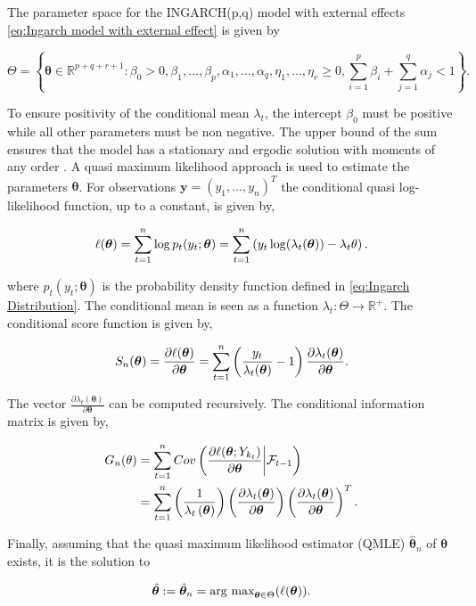 The parameter space for the INGARCH(p,q) model with external effects \ref{eq:Ingarch model with external effect} is given by 

\begin{equation*}
\Theta = \left\{ \bm{\theta} \in \mathbb{R}^{p+q+r+1}: \beta_0 > 0, \beta_1,\ldots,\beta_p,\alpha_1,\ldots,\alpha_q,\eta_1,\ldots,\eta_r \geq 0, \sum_{i=1}^p\beta_i + \sum_{j=1}^q\alpha_j < 1 \right\}.
\label{eq:Ingarch parameter space}
\end{equation*}

To ensure positivity of the conditional mean $\lambda_t$, the intercept $\beta_0$ must be positive while all other parameters must be non negative. The upper bound of the sum ensures that the model has a stationary and ergodic solution with moments of any order \cite{Ferland:2006,Fokianos:2009,Doukhan:2012}. A quasi maximum likelihood approach is used to estimate the parameters $\bm{\theta}$. 
For observations $\textbf{y} = \left(y_1,\ldots,y_n\right)^T$ the conditional quasi log-likelihood function, up to a constant, is given by,

\begin{equation}
\ell(\bm{\theta}) = \sum_{t=1}^n\log p_t(y_t;\bm{\theta}) = \sum_{t=1}^n \left(y_t\log(\lambda_t(\bm{\theta})) - \lambda_t{\theta}\right).
\label{eq: Quasi log likelihood}
\end{equation}

where $p_t(y_t;\bm{\theta})$ is the probability density function defined in \ref{eq:Ingarch Distribution}. The conditional mean is seen as a function $\lambda_t: \Theta \rightarrow \mathbb{R}^{+}$. The conditional score function is given by,

\begin{equation}
S_n(\bm{\theta}) = \frac{\partial \ell(\bm{\theta})}{\partial \bm{\theta}} = \sum_{t=1}^n\left(\frac{y_t}{\lambda_t(\bm{\theta})}-1\right)\frac{\partial\lambda_t(\bm{\theta})}{\partial \bm{\theta}}.
\label{eq:conditional score}
\end{equation}

The vector $\frac{\partial\lambda_t(\bm{\theta})}{\partial \bm{\theta}}$ can be computed recursively. 
The conditional information matrix is given by, 

\begin{align*}
G_n(\theta) &= \sum_{t=1}^n Cov\left(\frac{\partial \ell(\bm{\theta}; Y_{k_t})}{\partial \bm{\theta}} \middle| \mathcal{F}_{t-1}\right) \\
&=  \sum_{t=1}^n \left(\frac{1}{\lambda_t\left(\bm{\theta}\right)}\right) \left(\frac{\partial \lambda_t(\bm{\theta})}{\partial \bm{\theta}}\right)\left(\frac{\partial \lambda_t(\bm{\theta})}{\partial \bm{\theta}}\right)^T.
\label{eq:conditional information matrix}
\end{align*}

Finally, assuming that the quasi maximum likelihood estimator (QMLE) $\hat{\bm{\theta}}_n$ of $\bm{\theta}$ exists, it is the solution to 

\begin{equation}
\hat{\bm{\theta}}:= \hat{\bm{\theta}}_n = \text{arg max}_{\bm{\theta} \in \Theta} (\ell(\bm{\theta})). 
\label{eq:ingarch qmle}
\end{equation}

